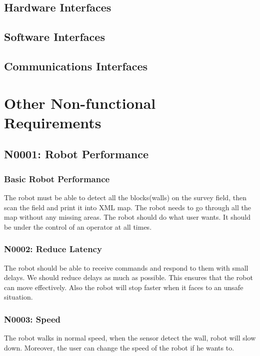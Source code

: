 \documentclass[11pt, a4paper]{report}
\begin{document}
\section{Hardware Interfaces}


\section{Software Interfaces}



\section{Communications Interfaces}

\pagebreak



\chapter{Other Non-functional Requirements}

\section{N0001: Robot Performance}
\subsection{Basic Robot Performance} 
The robot must be able to detect all the blocks(walls) on the survey field, then scan the field and print it into XML map. The robot needs to go through all the map without any missing areas. The robot should do what user wants. It should be under the control of an operator at all times.


\subsection{N0002: Reduce Latency}
The robot should be able to receive commands and respond to them with small delays. We should reduce delays as much as possible. This ensures that the robot can move effectively. Also the robot will stop faster when it faces to an unsafe situation. 


\subsection{N0003: Speed}
The robot walks in normal speed, when the sensor detect the wall, robot will slow down. Moreover, the user can change the speed of the robot if he wants to.
\end{document}
